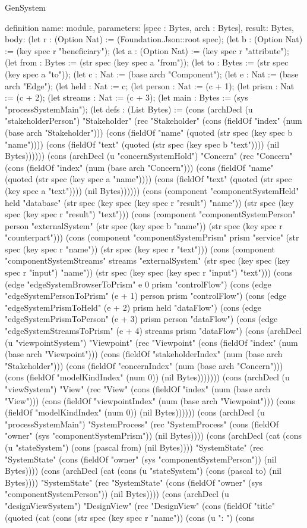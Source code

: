\begin{lexlean}{GenSystem}
\begin{semanticmodule}
{definition{
  name: module,
  parameters: [spec : Bytes, arch : Bytes],
  result: Bytes,
  body: (let r : (Option Nat) := (Foundation.Json::root spec); (let b : (Option Nat) := (key spec r "beneficiary"); (let a : (Option Nat) := (key spec r "attribute"); (let from : Bytes := (str spec (key spec a "from")); (let to : Bytes := (str spec (key spec a "to")); (let c : Nat := (base arch "Component"); (let e : Nat := (base arch "Edge"); (let held : Nat := c; (let person : Nat := (c + 1); (let prism : Nat := (c + 2); (let streams : Nat := (c + 3); (let main : Bytes := (sys "processSystemMain"); (let defs : (List Bytes) := (cons (archDecl (u "stakeholderPerson") "Stakeholder" (rec "Stakeholder" (cons (fieldOf "index" (num (base arch "Stakeholder"))) (cons (fieldOf "name" (quoted (str spec (key spec b "name")))) (cons (fieldOf "text" (quoted (str spec (key spec b "text")))) (nil Bytes)))))) (cons (archDecl (u "concernSystemHold") "Concern" (rec "Concern" (cons (fieldOf "index" (num (base arch "Concern"))) (cons (fieldOf "name" (quoted (str spec (key spec a "name")))) (cons (fieldOf "text" (quoted (str spec (key spec a "text")))) (nil Bytes)))))) (cons (component "componentSystemHeld" held "database" (str spec (key spec (key spec r "result") "name")) (str spec (key spec (key spec r "result") "text"))) (cons (component "componentSystemPerson" person "externalSystem" (str spec (key spec b "name")) (str spec (key spec r "counterpart"))) (cons (component "componentSystemPrism" prism "service" (str spec (key spec r "name")) (str spec (key spec r "text"))) (cons (component "componentSystemStreams" streams "externalSystem" (str spec (key spec (key spec r "input") "name")) (str spec (key spec (key spec r "input") "text"))) (cons (edge "edgeSystemBrowserToPrism" e 0 prism "controlFlow") (cons (edge "edgeSystemPersonToPrism" (e + 1) person prism "controlFlow") (cons (edge "edgeSystemPrismToHeld" (e + 2) prism held "dataFlow") (cons (edge "edgeSystemPrismToPerson" (e + 3) prism person "dataFlow") (cons (edge "edgeSystemStreamsToPrism" (e + 4) streams prism "dataFlow") (cons (archDecl (u "viewpointSystem") "Viewpoint" (rec "Viewpoint" (cons (fieldOf "index" (num (base arch "Viewpoint"))) (cons (fieldOf "stakeholderIndex" (num (base arch "Stakeholder"))) (cons (fieldOf "concernIndex" (num (base arch "Concern"))) (cons (fieldOf "modelKindIndex" (num 0)) (nil Bytes))))))) (cons (archDecl (u "viewSystem") "View" (rec "View" (cons (fieldOf "index" (num (base arch "View"))) (cons (fieldOf "viewpointIndex" (num (base arch "Viewpoint"))) (cons (fieldOf "modelKindIndex" (num 0)) (nil Bytes)))))) (cons (archDecl (u "processSystemMain") "SystemProcess" (rec "SystemProcess" (cons (fieldOf "owner" (sys "componentSystemPrism")) (nil Bytes)))) (cons (archDecl (cat (cons (u "stateSystem") (cons (pascal from) (nil Bytes)))) "SystemState" (rec "SystemState" (cons (fieldOf "owner" (sys "componentSystemPerson")) (nil Bytes)))) (cons (archDecl (cat (cons (u "stateSystem") (cons (pascal to) (nil Bytes)))) "SystemState" (rec "SystemState" (cons (fieldOf "owner" (sys "componentSystemPerson")) (nil Bytes)))) (cons (archDecl (u "designViewSystem") "DesignView" (rec "DesignView" (cons (fieldOf "title" (quoted (cat (cons (str spec (key spec r "name")) (cons (u ": ") (cons }}
\end{semanticmodule}
\end{lexlean}
